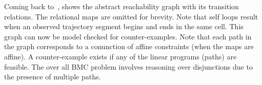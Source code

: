 \begin{example}
    Coming back to~, 
    shows the abstract reachability graph with its transition
    relations. The relational maps are omitted for brevity.
    Note that self loops result when an observed trajectory
    segment begins and ends in the same cell. This graph can now be
    model checked for counter-examples. Note that each path in the
    graph corresponds to a conunction of affine constraints (when the
    maps are affine). A counter-example exists if any of the
    linear programs (paths) are feasible. The over all BMC problem
    involves reasoning over disjunctions due to the presence of
    multiple paths.

\end{example}



%
